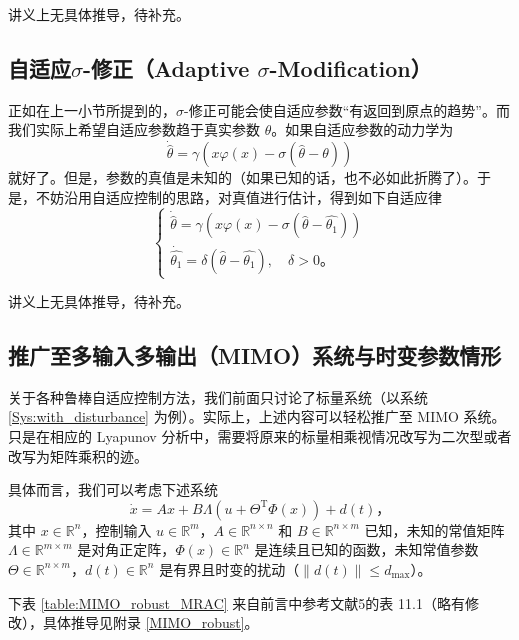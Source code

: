 讲义上无具体推导，待补充。

\subsection{\texorpdfstring{自适应$\sigma$-修正（Adaptive $\sigma$-Modification）}{自适应σ-修正（Adaptive σ-Modification）}}

正如在上一小节所提到的，$\sigma$-修正可能会使自适应参数“有返回到原点的趋势”。而我们实际上希望自适应参数趋于真实参数 $\theta$。如果自适应参数的动力学为
\[
    \dot{\hat{\theta}} = \gamma \left( x\varphi(x) - \sigma \left(\hat{\theta} - \theta \right) \right)
\]
就好了。但是，参数的真值是未知的（如果已知的话，也不必如此折腾了）。于是，不妨沿用自适应控制的思路，对真值进行估计，得到如下自适应律
\[
\begin{cases}
    \dot{\hat{\theta}} = \gamma \left( x\varphi(x) - \sigma \left(\hat{\theta} - \hat{\theta_1} \right) \right) \\
    \dot{\hat{\theta_1}} = \delta \left( \hat{\theta} - \hat{\theta_1} \right), \quad \delta > 0 \text{。}
\end{cases}
\]

讲义上无具体推导，待补充。

\subsection{推广至多输入多输出（MIMO）系统与时变参数情形}

关于各种鲁棒自适应控制方法，我们前面只讨论了标量系统（以系统 \eqref{Sys:with_disturbance} 为例）。实际上，上述内容可以轻松推广至 MIMO 系统。只是在相应的 Lyapunov 分析中，需要将原来的标量相乘视情况改写为二次型或者改写为矩阵乘积的迹。

具体而言，我们可以考虑下述系统
\begin{equation}
    \dot{x} = A x + B \Lambda \left( u + \Theta^\mathrm{T} \Phi(x) \right) + d(t) \text{，}
\end{equation}
其中 $x \in \mathbb{R}^n$，控制输入 $u \in \mathbb{R}^m$，$A \in \mathbb{R}^{n \times n}$ 和 $B \in \mathbb{R}^{n \times m}$ 已知，未知的常值矩阵 $\Lambda \in \mathbb{R}^{m \times m}$ 是对角正定阵，$\Phi(x) \in \mathbb{R}^n$ 是连续且已知的函数，未知常值参数 $\Theta \in \mathbb{R}^{n \times m}$，$d(t) \in \mathbb{R}^n$ 是有界且时变的扰动（$\| d(t) \| \leq d_{\mathrm{max}}$）。

下表 \ref{table:MIMO_robust_MRAC} 来自前言中参考文献5的表 11.1（略有修改），具体推导见附录 \ref{MIMO_robust}。

